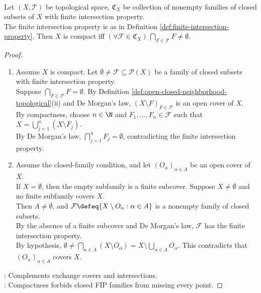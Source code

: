 \begin{proposition} \label{prop:topological-compactness-fip} \\
Let $(X,\mathcal{T})$ be topological space, $\mathfrak{C}_X$ be collection of nonempty families of closed subsets of $X$ with finite intersection property.\\
The finite intersection property is as in Definition \ref{def:finite-intersection-property}. Then $X$ is compact iff $(\forall\mathcal{F}\in\mathfrak{C}_X)\,\bigcap\limits_{F\in\mathcal{F}}F\neq\emptyset$.
\begin{proof}
\begin{enumerate}[label=\roman*.]
\setlength{\itemsep}{0pt}
\item[$(\Rightarrow)$] Assume $X$ is compact. Let $\emptyset\neq\mathcal{F}\subseteq\mathcal{P}(X)$ be a family of closed subsets with finite intersection property.\\
Suppose $\bigcap_{F\in\mathcal{F}}F=\emptyset$. By Definition \ref{def:open-closed-neighborhood-topological}(ii) and De Morgan's law, $(X\setminus F)_{F\in\mathcal{F}}$ is an open cover of $X$.\\
By compactness, choose $n\in\N$ and $F_1,\ldots,F_n\in\mathcal{F}$ such that $X=\bigcup\limits_{j=1}^n(X\setminus F_j)$.\\
By De Morgan's law, $\bigcap_{j=1}^nF_j=\emptyset$, contradicting the finite intersection property.
\item[$(\Leftarrow)$] Assume the closed-family condition, and let $(O_\alpha)_{\alpha\in A}$ be an open cover of $X$.\\
If $X=\emptyset$, then the empty subfamily is a finite subcover. Suppose $X\neq\emptyset$ and no finite subfamily covers $X$.\\
Then $A\neq\emptyset$, and $\mathcal{F}\defeq\{X\setminus O_\alpha:\alpha\in A\}$ is a nonempty family of closed subsets.\\
By the absence of a finite subcover and De Morgan's law, $\mathcal{F}$ has the finite intersection property.\\
By hypothesis, $\emptyset\neq\bigcap\limits_{\alpha\in A}(X\setminus O_\alpha)=X\setminus\bigcup\limits_{\alpha\in A}O_\alpha$. This contradicts that $(O_\alpha)_{\alpha\in A}$ covers $X$.
\end{enumerate}
: Complements exchange covers and intersections.\\
: Compactness forbids closed FIP families from missing every point.
\end{proof}
\end{proposition}

